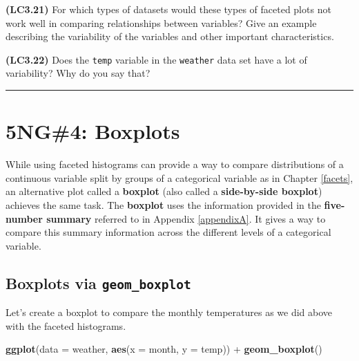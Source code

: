 \documentclass[]{tufte-book}
\newenvironment{Shaded}{\begin{snugshade}}{\end{snugshade}}
\newcommand{\KeywordTok}[1]{\textcolor[rgb]{0.13,0.29,0.53}{\textbf{{#1}}}}
\newcommand{\DataTypeTok}[1]{\textcolor[rgb]{0.13,0.29,0.53}{{#1}}}
\newcommand{\StringTok}[1]{\textcolor[rgb]{0.31,0.60,0.02}{{#1}}}
\newcommand{\NormalTok}[1]{{#1}}
\let\oldrule=\rule
\renewcommand{\rule}[1]{\oldrule{\linewidth}}
\begin{document}
\textbf{(LC3.21)} For which types of datasets would these types of
faceted plots not work well in comparing relationships between
variables? Give an example describing the variability of the variables
and other important characteristics.

\textbf{(LC3.22)} Does the \texttt{temp} variable in the
\texttt{weather} data set have a lot of variability? Why do you say
that?

\begin{center}\rule{0.5\linewidth}{\linethickness}\end{center}

\section{5NG\#4: Boxplots}\label{ng4-boxplots}

While using faceted histograms can provide a way to compare
distributions of a continuous variable split by groups of a categorical
variable as in Chapter \ref{facets}, an alternative plot called a
\textbf{boxplot} (also called a \textbf{side-by-side boxplot}) achieves
the same task. The \textbf{boxplot} uses the information provided in the
\textbf{five-number summary} referred to in Appendix \ref{appendixA}. It
gives a way to compare this summary information across the different
levels of a categorical variable.

\subsection{\texorpdfstring{Boxplots via
\texttt{geom\_boxplot}}{Boxplots via geom\_boxplot}}\label{boxplots-via-geom_boxplot}

Let's create a boxplot to compare the monthly temperatures as we did
above with the faceted histograms.

\begin{Shaded}
\begin{Highlighting}[]
\KeywordTok{ggplot}\NormalTok{(}\DataTypeTok{data =} \NormalTok{weather, }\KeywordTok{aes}\NormalTok{(}\DataTypeTok{x =} \NormalTok{month, }\DataTypeTok{y =} \NormalTok{temp)) +}
\StringTok{  }\KeywordTok{geom_boxplot}\NormalTok{()}
\end{Highlighting}
\end{Shaded}
\end{document}
